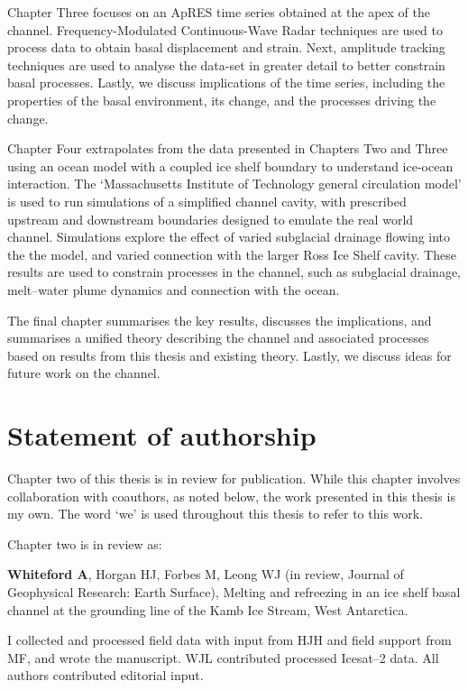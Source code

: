 Chapter Three focuses on an ApRES time series obtained at the apex of the channel.  Frequency-Modulated Continuous-Wave Radar techniques are used to process data to obtain basal displacement and strain.  Next, amplitude tracking techniques are used to analyse the data-set in greater detail to better constrain basal processes. Lastly, we discuss implications of the time series, including the properties of the basal environment, its change, and the processes driving the change.

Chapter Four extrapolates from the data presented in Chapters Two and Three using an ocean model with a coupled ice shelf boundary to understand ice-ocean interaction. The `Massachusetts Institute of Technology general circulation model' is used to run simulations of a simplified channel cavity, with prescribed upstream and downstream boundaries designed to emulate the real world channel. Simulations explore the effect of varied subglacial drainage flowing into the the model, and varied connection with the larger Ross Ice Shelf cavity. These results are  used to constrain processes in the channel, such as subglacial drainage, melt--water plume dynamics and connection with the ocean.

The final chapter summarises the key results, discusses the implications, and summarises  a unified theory describing the channel and associated processes based on results from this thesis and existing theory. Lastly, we discuss ideas for future work on the channel. 

\section{Statement of authorship}
Chapter two of this thesis is in review for publication. While this chapter involves collaboration with coauthors, as noted below, the work presented in this thesis is my own. The word `we' is used throughout this thesis to refer to this work. 

Chapter two is in review as:

\textbf{Whiteford A}, Horgan HJ, Forbes M, Leong WJ (in review, Journal of Geophysical Research: Earth Surface), Melting and refreezing in an ice shelf basal channel at the grounding line of the Kamb Ice Stream, West Antarctica. 

I collected and processed field data with input from HJH and field support from MF, and wrote the manuscript. WJL contributed processed Icesat--2 data. All authors contributed editorial input. 



